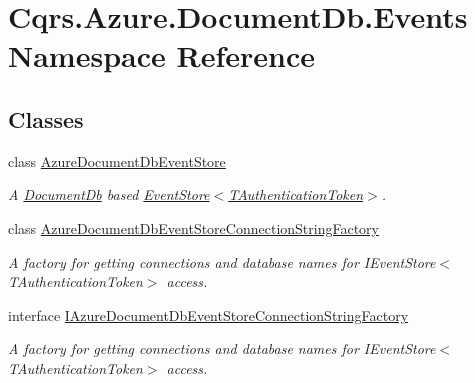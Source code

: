 \hypertarget{namespaceCqrs_1_1Azure_1_1DocumentDb_1_1Events}{}\section{Cqrs.\+Azure.\+Document\+Db.\+Events Namespace Reference}
\label{namespaceCqrs_1_1Azure_1_1DocumentDb_1_1Events}
\subsection*{Classes}
\begin{DoxyCompactItemize}
\item 
class \hyperlink{classCqrs_1_1Azure_1_1DocumentDb_1_1Events_1_1AzureDocumentDbEventStore}{Azure\+Document\+Db\+Event\+Store}
\begin{DoxyCompactList}\small\item\em A \hyperlink{namespaceCqrs_1_1Azure_1_1DocumentDb}{Document\+Db} based \hyperlink{classCqrs_1_1Events_1_1EventStore_a6346cb2aea4c5b4e740dc6cfb15abab8_a6346cb2aea4c5b4e740dc6cfb15abab8}{Event\+Store$<$\+T\+Authentication\+Token$>$}. \end{DoxyCompactList}\item 
class \hyperlink{classCqrs_1_1Azure_1_1DocumentDb_1_1Events_1_1AzureDocumentDbEventStoreConnectionStringFactory}{Azure\+Document\+Db\+Event\+Store\+Connection\+String\+Factory}
\begin{DoxyCompactList}\small\item\em A factory for getting connections and database names for I\+Event\+Store$<$\+T\+Authentication\+Token$>$ access. \end{DoxyCompactList}\item 
interface \hyperlink{interfaceCqrs_1_1Azure_1_1DocumentDb_1_1Events_1_1IAzureDocumentDbEventStoreConnectionStringFactory}{I\+Azure\+Document\+Db\+Event\+Store\+Connection\+String\+Factory}
\begin{DoxyCompactList}\small\item\em A factory for getting connections and database names for I\+Event\+Store$<$\+T\+Authentication\+Token$>$ access. \end{DoxyCompactList}\end{DoxyCompactItemize}

